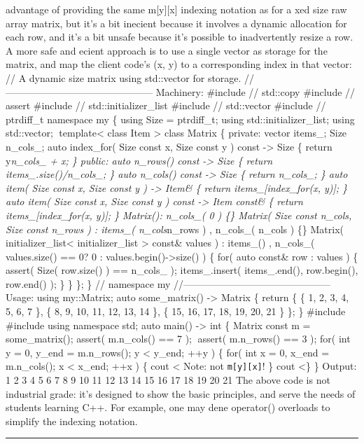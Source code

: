 advantage of providing the same m{[}y{]}{[}x{]} indexing notation as for
a xed size raw array matrix, but it's a bit inecient because it involves
a dynamic allocation for each row, and it's a bit unsafe because it's
possible to inadvertently resize a row. A more safe and ecient approach
is to use a single vector as storage for the matrix, and map the client
code's (x, y) to a corresponding index in that vector: // A dynamic size
matrix using std::vector for storage.
//--------------------------------------------- Machinery: \#include //
std::copy \#include // assert \#include // std::initializer\_list
\#include // std::vector \#include // ptrdiff\_t namespace my \{ using
Size = ptrdiff\_t; using std::initializer\_list; using std::vector;
template\textless{} class Item \textgreater{} class Matrix \{ private:
vector items\_; Size n\_cols\_; auto index\_for( Size const x, Size
const y ) const -\textgreater{} Size \{ return y\emph{n\_cols\_ + x; \}
public: auto n\_rows() const -\textgreater{} Size \{ return
items\_.size()/n\_cols\_; \} auto n\_cols() const -\textgreater{} Size
\{ return n\_cols\_; \} auto item( Size const x, Size const y )
-\textgreater{} Item\& \{ return items\_{[}index\_for(x, y){]}; \} auto
item( Size const x, Size const y ) const -\textgreater{} Item const\& \{
return items\_{[}index\_for(x, y){]}; \} Matrix(): n\_cols\_( 0 ) \{\}
Matrix( Size const n\_cols, Size const n\_rows ) : items\_(
n\_cols}n\_rows ) , n\_cols\_( n\_cols ) \{\} Matrix(
initializer\_list\textless{} initializer\_list \textgreater{} const\&
values ) : items\_() , n\_cols\_( values.size() == 0? 0 :
values.begin()-\textgreater size() ) \{ for( auto const\& row : values )
\{ assert( Size( row.size() ) == n\_cols\_ ); items\_.insert(
items\_.end(), row.begin(), row.end() ); \} \} \}; \} // namespace my
//--------------------------------------------- Usage: using my::Matrix;
auto some\_matrix() -\textgreater{} Matrix \{ return \{ \{ 1, 2, 3, 4,
5, 6, 7 \}, \{ 8, 9, 10, 11, 12, 13, 14 \}, \{ 15, 16, 17, 18, 19, 20,
21 \} \}; \} \#include \#include using namespace std; auto main()
-\textgreater{} int \{ Matrix const m = some\_matrix(); assert(
m.n\_cols() == 7 ); assert( m.n\_rows() == 3 ); for( int y = 0, y\_end
= m.n\_rows(); y \textless{} y\_end; ++y ) \{ for( int x = 0, x\_end =
m.n\_cols(); x \textless{} x\_end; ++x ) \{ cout \textless{} Note: not
\passthrough{\lstinline!m[y][x]!}! \} cout \textless\} \} Output: 1 2 3
4 5 6 7 8 9 10 11 12 13 14 15 16 17 18 19 20 21 The above code is not
industrial grade: it's designed to show the basic principles, and serve
the needs of students learning C++. For example, one may dene operator()
overloads to simplify the indexing notation.

\begin{center}\rule{0.5\linewidth}{0.5pt}\end{center}

